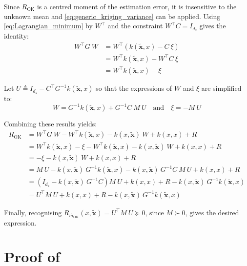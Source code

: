 Since $R_{\mathrm{OK}}$ is a centred moment of the estimation error, it is insensitive to the unknown mean and \eqref{eq:generic_kriging_variance} can be applied. Using \eqref{eq:Lagrangian_minimum} by $W^\top$ and the constraint $W^\top C=I_{d_z}$ gives the identity:
\begin{equation}
	\begin{aligned}
	W^\top G\:W&=W^\top\left(k(\tilde{\mathbf{x}},x)-C\:\xi\right)\\
	&=W^\top k(\tilde{\mathbf{x}},x)-W^\top C\:\xi\\
	&=W^\top k(\tilde{\mathbf{x}},x)-\xi
	\end{aligned}\label{eq:OK_identity}
\end{equation}

Let $U\triangleq I_{d_z}-C^\top G^{-1}k(\tilde{\mathbf{x}},x)$ so that the expressions of $W$ and $\xi$ are simplified to:
\begin{equation}
	W=G^{-1}k(\tilde{\mathbf{x}},x)+G^{-1}C\:M\:U\quad\text{and}\quad\xi=-M\:U
\end{equation}

Combining these results yields:
\begin{equation}
	\begin{aligned}
	R_{\mathrm{OK}}&=W^\top G\:W-W^\top k(\tilde{\mathbf{x}},x)-k(x,\tilde{\mathbf{x}})\:W+k(x,x)+R\\
	&=W^\top k(\tilde{\mathbf{x}},x)-\xi-W^\top k(\tilde{\mathbf{x}},x)-k(x,\tilde{\mathbf{x}})\:W+k(x,x)+R\\
	&=-\xi-k(x,\tilde{\mathbf{x}})\:W+k(x,x)+R\\
	&=M\:U-k(x,\tilde{\mathbf{x}})\:G^{-1}k(\tilde{\mathbf{x}},x)-k(x,\tilde{\mathbf{x}})\:G^{-1}C\:M\:U+k(x,x)+R\\
	&=\left(I_{d_z}-k(x,\tilde{\mathbf{x}})\:G^{-1}C\right)M\:U+k(x,x)+R-k(x,\tilde{\mathbf{x}})\:G^{-1}k(\tilde{\mathbf{x}},x)\\
	&=U^\top M\:U+k(x,x)+R-k(x,\tilde{\mathbf{x}})\:G^{-1}k(\tilde{\mathbf{x}},x)
	\end{aligned}
\end{equation}

Finally, recognising $R_{\hat{m}_{\mathrm{OK}}}(x,\tilde{\mathbf{x}})=U^\top M\:U\succeq0$, since $M\succ0$, gives the desired expression.

\section[Proof of Proposition 3.9]{Proof of }\label{sec:proof_UK}

